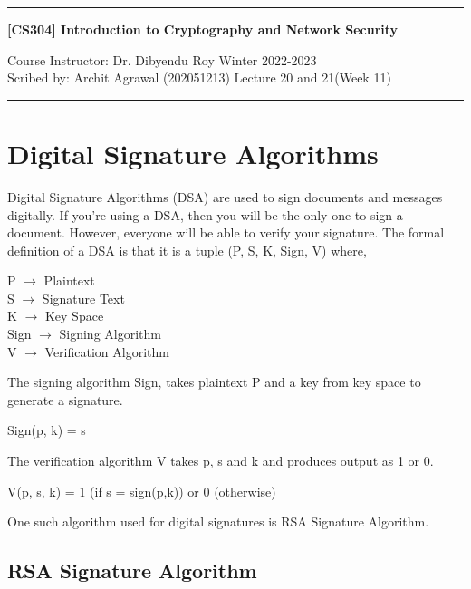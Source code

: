 \documentclass[11pt]{article}
\begin{document}
\noindent
\rule{\textwidth}{1pt}
\begin{center}
{\bf [CS304] Introduction to Cryptography and Network Security}
\end{center}
Course Instructor: Dr. Dibyendu Roy \hfill Winter 2022-2023\\
Scribed by: Archit Agrawal (202051213) \hfill Lecture 20 and 21(Week 11)
\\
\rule{\textwidth}{1pt}

\section{Digital Signature Algorithms}
Digital Signature Algorithms (DSA) are used to sign documents and messages digitally. If you're using a DSA, then you will be the only one to sign a document. However, everyone will be able to verify your signature. The formal definition of a DSA is that it is a tuple (P, S, K, Sign, V) where, 
\begin{center}
    P $\rightarrow$ Plaintext\\
    S $\rightarrow$ Signature Text\\
    K $\rightarrow$ Key Space\\
    Sign $\rightarrow$ Signing Algorithm\\
    V $\rightarrow$ Verification Algorithm\\
\end{center}
The signing algorithm Sign, takes plaintext P and a key from key space to generate a signature.
\begin{center}
    Sign(p, k) = s
\end{center}
The verification algorithm V takes p, s and k and produces output as 1 or 0.
\begin{center}
    V(p, s, k) = 1 (if s = sign(p,k)) or 0 (otherwise)
\end{center}


One such algorithm used for digital signatures is RSA Signature Algorithm.

\subsection{RSA Signature Algorithm}
\end{document}
